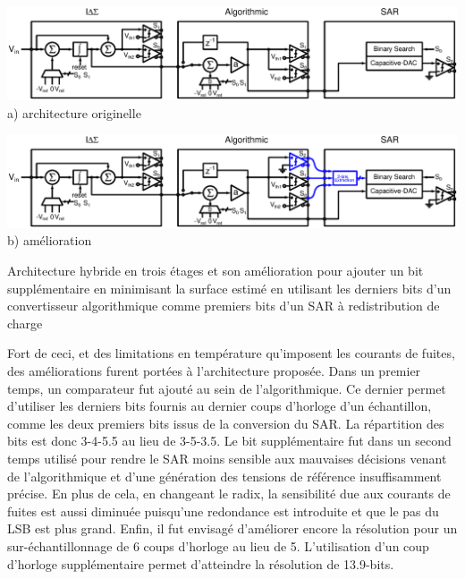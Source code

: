 \begin{mdframed}[linecolor=Prune,linewidth=1]
    \begin{center}
        \centering
        \begin{minipage}[b]{\textwidth}
            \centering
            \includegraphics[width=\textwidth]{Chapter4/Figs/architecture-full-principle.ps}
            a) architecture originelle
            \vspace{2em}
        \end{minipage}
        \begin{minipage}[b]{\textwidth}
            \centering
            \includegraphics[width=\textwidth]{Chapter4/Figs/architecture-full-principle-final.ps}
            b) amélioration
        \end{minipage}
        \caption[]{Architecture hybride en trois étages et son amélioration pour ajouter un bit supplémentaire en minimisant la surface estimé en utilisant les derniers bits d'un convertisseur algorithmique comme premiers bits d'un SAR à redistribution de charge}
        \label{fig:final-prop-adc-architecture}
    \end{center}
    Fort de ceci, et des limitations en température qu'imposent les courants de fuites, des améliorations furent portées à l'architecture proposée. Dans un premier temps, un comparateur fut ajouté au sein de l'algorithmique. Ce dernier permet d'utiliser les derniers bits fournis au dernier coups d'horloge d'un échantillon, comme les deux premiers bits issus de la conversion du SAR\@. La répartition des bits est donc 3-4-5.5 au lieu de 3-5-3.5. Le bit supplémentaire fut dans un second temps utilisé pour rendre le SAR moins sensible aux mauvaises décisions venant de l'algorithmique et d'une génération des tensions de référence insuffisamment précise. En plus de cela, en changeant le radix, la sensibilité due aux courants de fuites est aussi diminuée puisqu'une redondance est introduite et que le pas du LSB est plus grand. Enfin, il fut envisagé d'améliorer encore la résolution pour un sur-échantillonnage de 6 coups d'horloge au lieu de 5. L'utilisation d'un coup d'horloge supplémentaire permet d'atteindre la résolution de 13.9-bits.
    

\end{mdframed}
